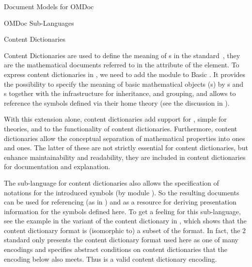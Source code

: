 \begin{tchapter}[id=document-model]{Document Models for OMDoc}
\begin{tsection}[id=sub-languages]{OMDoc Sub-Languages}
\begin{tsubsection}[id=sub-languages:cd]{{\omdoc} Content Dictionaries}
  
  Content Dictionaries are used to define the meaning of {s} in the
  {\openmath} standard~\cite{BusCapCar:2oms04}, they are the mathematical documents
  referred to in the {} attribute of the {}
  element.  To express content dictionaries in {\omdoc},
  we need to add the module {} to Basic {\omdoc}.  It provides the
  possibility to specify the meaning of basic mathematical objects ({s})
  by {s} and {s} together with the infrastructure for
  inheritance, and grouping, and allows to reference the symbols defined via their home
  theory (see the discussion in {}).
  
  With this extension alone, {\omdoc} content dictionaries add support for
  {}, simple {} for theories, and
  {} to the functionality of {\openmath} content
  dictionaries. Furthermore, {\omdoc} content dictionaries allow the conceptual separation
  of mathematical properties into {} ones and
  {} ones. The latter of these are not strictly essential
  for content dictionaries, but enhance maintainability and readability, they are included
  in {\openmath} content dictionaries for documentation and explanation.

  The sub-language for {\omdoc} content dictionaries also allows the specification of
  notations for the introduced symbols (by module {}). So the resulting
  documents can be used for referencing (as in {\openmath}) and as a resource for deriving
  presentation information for the symbols defined here.  To get a feeling for this
  sub-language, see the example in the {\omdoc} variant of the {\openmath} content
  dictionary {} in {}, which shows that the {\openmath}
  content dictionary format is (isomorphic to) a subset of the {\omdoc} format. In fact,
  the {\openmath}2 standard only presents the content dictionary format used here as one
  of many encodings and specifies abstract conditions on content dictionaries that the
  {\omdoc} encoding below also meets.  Thus {\omdoc} is a valid content dictionary
  encoding.
\end{tsubsection}


\end{tsection}
\end{tchapter}

